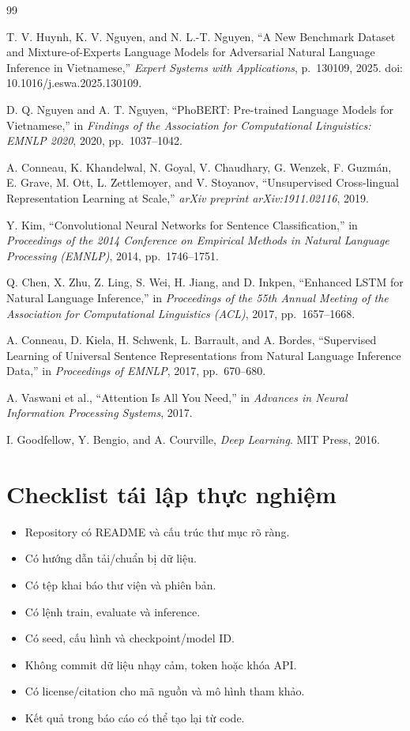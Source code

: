 \documentclass[12pt,a4paper,oneside]{report}
\newcommand{\checkitem}{\item[$\square$]}
\begin{document}
\begin{thebibliography}{99}

T. V. Huynh, K. V. Nguyen, and N. L.-T. Nguyen,
``A New Benchmark Dataset and Mixture-of-Experts Language Models for Adversarial Natural
Language Inference in Vietnamese,''
\textit{Expert Systems with Applications}, p.~130109, 2025.
doi: 10.1016/j.eswa.2025.130109.

D. Q. Nguyen and A. T. Nguyen,
``PhoBERT: Pre-trained Language Models for Vietnamese,''
in \textit{Findings of the Association for Computational Linguistics: EMNLP 2020}, 2020,
pp.~1037--1042.

A. Conneau, K. Khandelwal, N. Goyal, V. Chaudhary, G. Wenzek, F. Guzmán, E. Grave,
M. Ott, L. Zettlemoyer, and V. Stoyanov,
``Unsupervised Cross-lingual Representation Learning at Scale,''
\textit{arXiv preprint arXiv:1911.02116}, 2019.

Y. Kim, ``Convolutional Neural Networks for Sentence Classification,''
in \textit{Proceedings of the 2014 Conference on Empirical Methods in Natural Language
Processing (EMNLP)}, 2014, pp.~1746--1751.

Q. Chen, X. Zhu, Z. Ling, S. Wei, H. Jiang, and D. Inkpen,
``Enhanced LSTM for Natural Language Inference,''
in \textit{Proceedings of the 55th Annual Meeting of the Association for Computational
Linguistics (ACL)}, 2017, pp.~1657--1668.

A. Conneau, D. Kiela, H. Schwenk, L. Barrault, and A. Bordes,
``Supervised Learning of Universal Sentence Representations from Natural Language
Inference Data,''
in \textit{Proceedings of EMNLP}, 2017, pp.~670--680.

A. Vaswani et al., ``Attention Is All You Need,''
in \textit{Advances in Neural Information Processing Systems}, 2017.

I. Goodfellow, Y. Bengio, and A. Courville,
\textit{Deep Learning}. MIT Press, 2016.

\end{thebibliography}

\appendix

\chapter{Checklist tái lập thực nghiệm}
\begin{itemize}[leftmargin=*,itemsep=4pt]
  \checkitem Repository có README và cấu trúc thư mục rõ ràng.
  \checkitem Có hướng dẫn tải/chuẩn bị dữ liệu.
  \checkitem Có tệp khai báo thư viện và phiên bản.
  \checkitem Có lệnh train, evaluate và inference.
  \checkitem Có seed, cấu hình và checkpoint/model ID.
  \checkitem Không commit dữ liệu nhạy cảm, token hoặc khóa API.
  \checkitem Có license/citation cho mã nguồn và mô hình tham khảo.
  \checkitem Kết quả trong báo cáo có thể tạo lại từ code.
\end{itemize}
\end{document}
